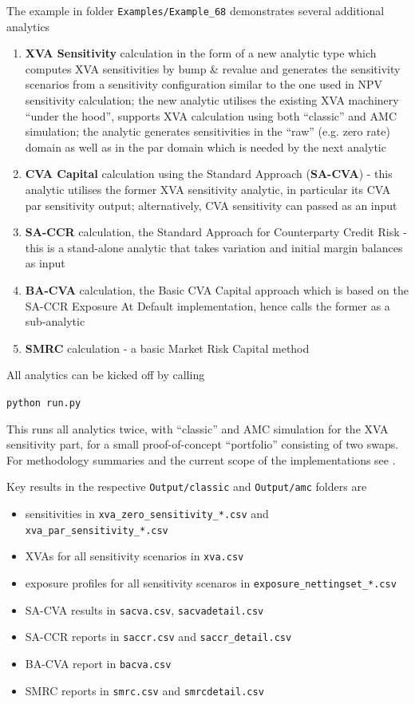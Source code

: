 The example in folder {\tt Examples/Example\_68} demonstrates several additional analytics
\begin{enumerate}
\item {\bf XVA Sensitivity} calculation in the form of a new analytic type which computes XVA sensitivities by
  bump \& revalue and generates the sensitivity scenarios from a sensitivity configuration similar to the one used
  in NPV sensitivity calculation; the new analytic utilises the existing XVA machinery ``under the hood'',
  supports XVA calculation using both ``classic'' and AMC simulation; the analytic generates sensitivities in the ``raw''
  (e.g. zero rate) domain as well as in the par domain which is needed by the next analytic
\item {\bf CVA Capital} calculation using the Standard Approach ({\bf SA-CVA}) - this analytic utilises the former
  XVA sensitivity analytic, in particular its CVA par sensitivity output; alternatively, CVA sensitivity can passed as an input
\item {\bf SA-CCR} calculation, the Standard Approach for Counterparty Credit Risk - this is a stand-alone analytic that takes
  variation and initial margin balances as input
\item {\bf BA-CVA} calculation, the Basic CVA Capital approach which is based on the SA-CCR Exposure At Default implementation,
  hence calls the former as a sub-analytic
  \item {\bf SMRC} calculation - a basic Market Risk Capital method
\end{enumerate}

All analytics can be kicked off by calling
\medskip
\centerline{\tt python run.py}

\medskip
This runs all analytics twice, with ``classic'' and AMC simulation for the XVA sensitivity part, for a small proof-of-concept
``portfolio'' consisting of two swaps. For methodology summaries and the current scope of the implementations see \cite{methods}.

Key results in the respective {\tt Output/classic} and {\tt Output/amc} folders are
\begin{itemize}
\item sensitivities in {\tt xva\_zero\_sensitivity\_*.csv} and {\tt xva\_par\_sensitivity\_*.csv}
\item XVAs for all sensitivity scenarios in {\tt xva.csv}
\item exposure profiles for all sensitivity scenaros in {\tt exposure\_nettingset\_*.csv}
\item SA-CVA results in {\tt sacva.csv}, {\tt sacvadetail.csv}
\item SA-CCR reports in {\tt saccr.csv} and {\tt saccr\_detail.csv}
\item BA-CVA report in {\tt bacva.csv}
\item SMRC reports in {\tt smrc.csv} and {\tt smrcdetail.csv}
\end{itemize}

